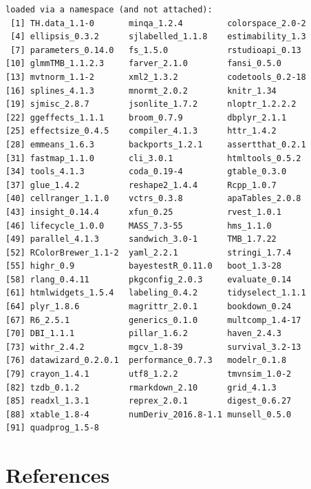 \documentclass[
  11pt,
]{book}
\begin{document}
\begin{verbatim}
loaded via a namespace (and not attached):
 [1] TH.data_1.1-0       minqa_1.2.4         colorspace_2.0-2   
 [4] ellipsis_0.3.2      sjlabelled_1.1.8    estimability_1.3   
 [7] parameters_0.14.0   fs_1.5.0            rstudioapi_0.13    
[10] glmmTMB_1.1.2.3     farver_2.1.0        fansi_0.5.0        
[13] mvtnorm_1.1-2       xml2_1.3.2          codetools_0.2-18   
[16] splines_4.1.3       mnormt_2.0.2        knitr_1.34         
[19] sjmisc_2.8.7        jsonlite_1.7.2      nloptr_1.2.2.2     
[22] ggeffects_1.1.1     broom_0.7.9         dbplyr_2.1.1       
[25] effectsize_0.4.5    compiler_4.1.3      httr_1.4.2         
[28] emmeans_1.6.3       backports_1.2.1     assertthat_0.2.1   
[31] fastmap_1.1.0       cli_3.0.1           htmltools_0.5.2    
[34] tools_4.1.3         coda_0.19-4         gtable_0.3.0       
[37] glue_1.4.2          reshape2_1.4.4      Rcpp_1.0.7         
[40] cellranger_1.1.0    vctrs_0.3.8         apaTables_2.0.8    
[43] insight_0.14.4      xfun_0.25           rvest_1.0.1        
[46] lifecycle_1.0.0     MASS_7.3-55         hms_1.1.0          
[49] parallel_4.1.3      sandwich_3.0-1      TMB_1.7.22         
[52] RColorBrewer_1.1-2  yaml_2.2.1          stringi_1.7.4      
[55] highr_0.9           bayestestR_0.11.0   boot_1.3-28        
[58] rlang_0.4.11        pkgconfig_2.0.3     evaluate_0.14      
[61] htmlwidgets_1.5.4   labeling_0.4.2      tidyselect_1.1.1   
[64] plyr_1.8.6          magrittr_2.0.1      bookdown_0.24      
[67] R6_2.5.1            generics_0.1.0      multcomp_1.4-17    
[70] DBI_1.1.1           pillar_1.6.2        haven_2.4.3        
[73] withr_2.4.2         mgcv_1.8-39         survival_3.2-13    
[76] datawizard_0.2.0.1  performance_0.7.3   modelr_0.1.8       
[79] crayon_1.4.1        utf8_1.2.2          tmvnsim_1.0-2      
[82] tzdb_0.1.2          rmarkdown_2.10      grid_4.1.3         
[85] readxl_1.3.1        reprex_2.0.1        digest_0.6.27      
[88] xtable_1.8-4        numDeriv_2016.8-1.1 munsell_0.5.0      
[91] quadprog_1.5-8     
\end{verbatim}

\hypertarget{refs}{%
\chapter*{References}\label{refs}}

  
\end{document}
